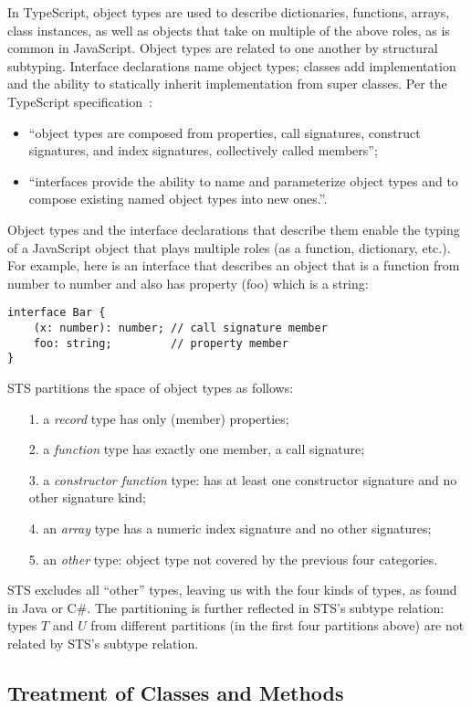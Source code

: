 In TypeScript, object types are used to describe dictionaries, functions, arrays, class instances,
as well as objects that take on multiple of the above roles, as is common in JavaScript. Object types are
related to one another by structural subtyping.  Interface declarations name object types; classes add implementation
and the ability to statically inherit implementation from super classes. Per the TypeScript specification~\cite{TSspec2016}:
\begin{itemize}
\item ``object types are composed from properties, call signatures, construct signatures, and index signatures, collectively called members'';
\item ``interfaces provide the ability to name and parameterize object types and to compose existing named object types into new ones.''.
\end{itemize} 
Object types and the interface declarations that describe them enable the typing of a JavaScript object that plays multiple roles
(as a function, dictionary, etc.). For example, here is an interface that describes an object that is a function from number to number
and also has property (foo) which is a string:
\begin{lstlisting}
interface Bar {
    (x: number): number; // call signature member
    foo: string;         // property member
}
\end{lstlisting}
STS partitions the space of object types as follows:
\begin{itemize}
\item[1.] a \emph{record} type has only (member) properties;
\item[2.] a \emph{function} type has exactly one member, a call signature;
\item[3.] a \emph{constructor function} type: has at least one constructor signature and no other signature kind;
\item[4.] an \emph{array} type has a numeric index signature and no other signatures;
\item[5.] an \emph{other} type: object type not covered by the previous four categories.
\end{itemize}
STS excludes all ``other'' types, leaving us with the four kinds of types, as found in Java or C\#.
The partitioning is further reflected in STS's subtype relation: 
types $T$ and $U$ from different partitions (in the first four partitions above)
are not related by STS's subtype relation.

\subsection{Treatment of Classes and Methods}

